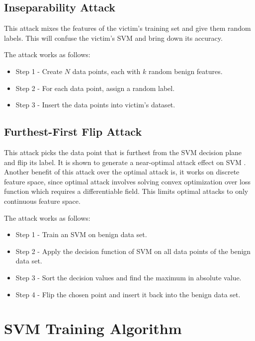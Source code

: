 \documentclass[10pt,conference,compsocconf,letterpaper]{IEEEtran}
\begin{document}
\subsection{Inseparability Attack}

This attack mixes the features of the victim's training set and give them random labels. This will confuse the victim's SVM and bring down its accuracy.

The attack works as follows:

\begin{itemize}
\item Step 1 - Create $N$ data points, each with $k$ random benign features.
\item Step 2 - For each data point, assign a random label.
\item Step 3 - Insert the data points into victim's dataset.
\end{itemize}

\subsection{Furthest-First Flip Attack}

This attack picks the data point that is furthest from the SVM decision plane and flip its label. It is shown to generate a near-optimal attack effect on SVM \cite{xiao12}. Another benefit of this attack over the optimal attack is, it works on discrete feature space, since optimal attack involves solving convex optimization over loss function which requires a differentiable field. This limits optimal attacks to only continuous feature space.

The attack works as follows:

\begin{itemize}
\item Step 1 - Train an SVM on benign data set.
\item Step 2 - Apply the decision function of SVM on all data points of the benign data set.
\item Step 3 - Sort the decision values and find the maximum in absolute value.
\item Step 4 - Flip the chosen point and insert it back into the benign data set.
\end{itemize}

\section{SVM Training Algorithm}
\end{document}
